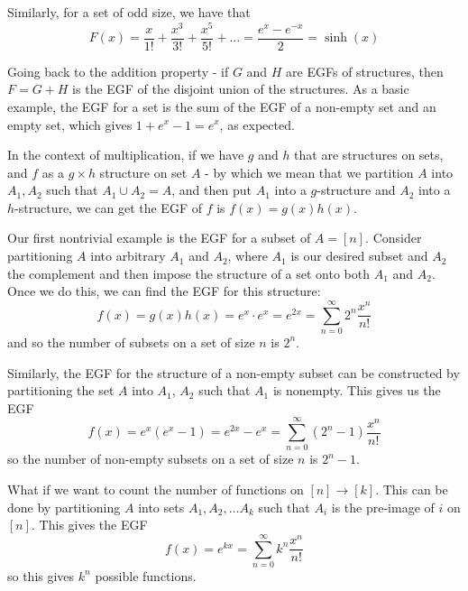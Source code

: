 \documentclass[11pt,twosided]{article}
\begin{document}
Similarly, for a set of odd size, we have that
\[
	F(x) = \frac{x}{1!}  + \frac{x^3}{3!} + \frac{x^5}{5!} + \ldots = \frac{e^x - e^{-x}}{2} = \sinh(x)
\]

Going back to the addition property - if $G$ and $H$ are EGFs of structures, then $F = G+H$ is the EGF of the disjoint union of the structures. As a basic example, the EGF for a set is the sum of the EGF of a non-empty set and an empty set, which gives $1+ e^x - 1 = e^x$, as expected.

In the context of multiplication, if we have $g$ and $h$ that are structures on sets, and $f$ as a $g \times h$ structure on set $A$ - by which we mean that we partition $A$ into $A_1, A_2$ such that $A_1 \cup A_2 = A$, and then put $A_1$ into a $g$-structure and $A_2$ into a $h$-structure, we can get the EGF of $f$ is $f(x) = g(x) h(x)$. 

Our first nontrivial example is the EGF for a subset of $A = [n]$. Consider partitioning $A$ into arbitrary $A_1$ and $A_2$, where $A_1$ is our desired subset and $A_2$ the complement and then impose the structure of a set onto both $A_1$ and $A_2$. Once we do this, we can find the EGF for this structure: 
\[
	f(x) = g(x) h(x) = e^x \cdot e^x = e^{2x} = \sum_{n=0}^\infty 2^n \frac{x^n}{n!}
\]
and so the number of subsets on a set of size $n$ is $2^n$.  

Similarly, the EGF for the structure of a non-empty subset can be constructed by partitioning the set $A$ into $A_1$, $A_2$ such that $A_1$ is nonempty. This gives us the EGF
\[
	f(x) = e^x (e^x - 1) = e^{2x} - e^x = \sum_{n=0}^\infty (2^n-1)\frac{x^n}{n!}
\]
so the number of non-empty subsets on a set of size $n$ is $2^n - 1$. 

What if we want to count the number of functions on $[n] \rightarrow [k]$. This can be done by partitioning $A$ into sets $A_1, A_2, \ldots A_k$ such that $A_i$ is the pre-image of $i$ on $[n]$. This gives the EGF
\[
	f(x) = e^{kx} = \sum_{n=0}^\infty k^n \frac{x^n}{n!}
\]
so this gives $k^n$ possible functions. 
\end{document}
